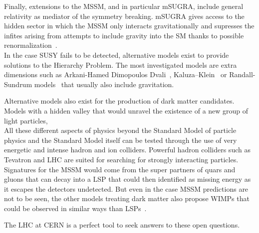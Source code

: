 	Finally, extensions to the MSSM, and in particular \acf{mSUGRA}, include general relativity as mediator of the symmetry breaking. mSUGRA gives access to the hidden sector in which the MSSM only interacts gravitationally and supresses the infites arising from attempts to include gravity into the SM thanks to possible renormalization~\cite{CHAMSEDDINE1982}.\\
	
	In the case SUSY fails to be detected, alternative models exist to provide solutions to the Hierarchy Problem. The most investigated models are extra dimensions such as Arkani-Hamed Dimopoulos Dvali~\cite{ADD1998,ADD1999}, Kaluza–Klein~\cite{KALUZA1921,KLEIN1926} or Randall-Sundrum models~\cite{RS1999I,RS1999II} that usually also include gravitation.
	
	
	
	Alternative models also exist for the production of dark matter candidates. Models with a hidden valley that would unravel the existence of a new group of light particles,\\
	
	All these different aspects of physics beyond the Standard Model of particle physics and the Standard Model itself can be tested through the use of very energetic and intense hadron and ion colliders. Powerful hadron colliders such as Tevatron and LHC are suited for searching for strongly interacting particles. Signatures for the MSSM would come from the super partners of quars and gluons that can decay into a LSP that could then identified as missing energy as it escapes the detectors undetected. But even in the case MSSM predictions are not to be seen, the other models treating dark matter also propose \acf{WIMPs} that could be observed in similar ways than LSPs~\cite{ASKEW2014}. 
	
	The LHC at CERN is a perfect tool to seek answers to these open questions.
	
	
